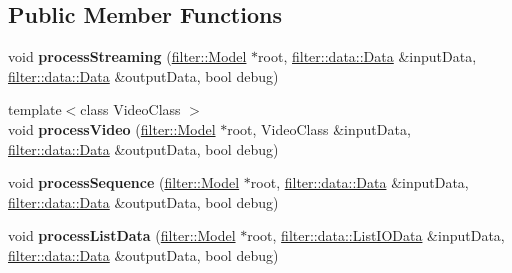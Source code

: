 \subsection*{Public Member Functions}
\begin{DoxyCompactItemize}
\item 
\mbox{\label{classorchestrator_1_1image_1_1_default_scheduler_abe112bc7fd8d4e9cbf3e40aa0b99d621}} 
void {\bfseries process\+Streaming} (\hyperlink{classfilter_1_1_model}{filter\+::\+Model} $\ast$root, \hyperlink{classfilter_1_1data_1_1_data}{filter\+::data\+::\+Data} \&input\+Data, \hyperlink{classfilter_1_1data_1_1_data}{filter\+::data\+::\+Data} \&output\+Data, bool debug)
\item 
\mbox{\label{classorchestrator_1_1image_1_1_default_scheduler_ad257f9697cc5158ca1bee71c36514dd7}} 
{\footnotesize template$<$class Video\+Class $>$ }\\void {\bfseries process\+Video} (\hyperlink{classfilter_1_1_model}{filter\+::\+Model} $\ast$root, Video\+Class \&input\+Data, \hyperlink{classfilter_1_1data_1_1_data}{filter\+::data\+::\+Data} \&output\+Data, bool debug)
\item 
\mbox{\label{classorchestrator_1_1image_1_1_default_scheduler_a6308d4fe7856fd9c05844a183b98b36e}} 
void {\bfseries process\+Sequence} (\hyperlink{classfilter_1_1_model}{filter\+::\+Model} $\ast$root, \hyperlink{classfilter_1_1data_1_1_data}{filter\+::data\+::\+Data} \&input\+Data, \hyperlink{classfilter_1_1data_1_1_data}{filter\+::data\+::\+Data} \&output\+Data, bool debug)
\item 
\mbox{\label{classorchestrator_1_1image_1_1_default_scheduler_a1f91904098a71297914e2591ba07c938}} 
void {\bfseries process\+List\+Data} (\hyperlink{classfilter_1_1_model}{filter\+::\+Model} $\ast$root, \hyperlink{classfilter_1_1data_1_1_list_i_o_data}{filter\+::data\+::\+List\+I\+O\+Data} \&input\+Data, \hyperlink{classfilter_1_1data_1_1_data}{filter\+::data\+::\+Data} \&output\+Data, bool debug)
\item 
\mbox{\label{classorchestrator_1_1image_1_1_default_scheduler_a51179bf83b16153f2b7eb13b7af6c22c}} 

\end{DoxyCompactItemize}
